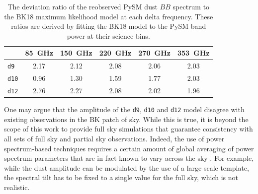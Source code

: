 \documentclass[twocolumn]{aastex631}
\newcommand{\dnine}{{\tt d9}}
\begin{document}
\begin{table}
    \centering
    \begin{tabular}{lccccc}
    \toprule 
     & 85~GHz & 150~GHz & 220~GHz & 270~GHz & 353~GHz \\
    \midrule
    \texttt{d9}  & 2.17 & 2.12 & 2.08 & 2.06 & 2.03 \\
    \texttt{d10} & 0.96 & 1.30 & 1.59 & 1.77 & 2.03 \\
    \texttt{d12} & 2.76	& 2.27 & 2.08 & 2.02 & 1.96 \\
   \bottomrule
    \end{tabular}
    \caption{The deviation ratio of the reobserved PySM dust $BB$ spectrum to the BK18 maximum likelihood model at each delta frequency. These ratios are derived by fitting the BK18 model to the PySM band power at their science bins.}
    \label{tab:BB_dustratio}
\end{table}

One may argue that the amplitude of the \texttt{d9}, \texttt{d10} and \texttt{d12} model disagree with existing observations in the BK patch of sky. While this is true, it is beyond the scope of this work to provide full sky simulations that guarantee consistency with all sets of full sky and partial sky observations. Indeed, the use of power spectrum-based techniques requires a certain amount of global averaging of power spectrum parameters that are in fact known to vary across the sky \cite{planck2016-l04}. For example, while the dust amplitude can be modulated by the use of a large scale template, the spectral tilt has to be fixed to a single value for the full sky, which is not realistic. 


\end{document}
